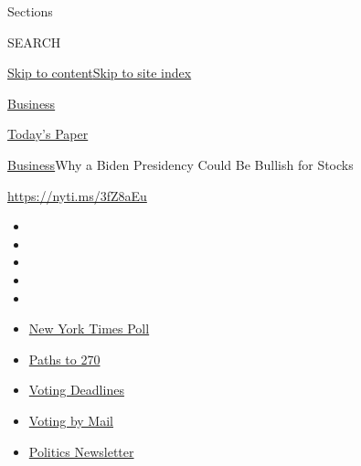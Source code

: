 Sections

SEARCH

\protect\hyperlink{site-content}{Skip to
content}\protect\hyperlink{site-index}{Skip to site index}

\href{https://www.nytimes3xbfgragh.onion/section/business}{Business}

\href{https://myaccount.nytimes3xbfgragh.onion/auth/login?response_type=cookie\&client_id=vi}{}

\href{https://www.nytimes3xbfgragh.onion/section/todayspaper}{Today's
Paper}

\href{/section/business}{Business}\textbar{}Why a Biden Presidency Could
Be Bullish for Stocks

\url{https://nyti.ms/3fZ8aEu}

\begin{itemize}
\item
\item
\item
\item
\item
\end{itemize}

\begin{itemize}
\item
  \href{https://www.nytimes3xbfgragh.onion/2020/09/12/us/politics/biden-trump-poll-wisconsin-minnesota.html?action=click\&pgtype=Article\&state=default\&region=TOP_BANNER\&context=storylines_menu}{New
  York Times Poll}
\item
  \href{https://www.nytimes3xbfgragh.onion/interactive/2020/us/elections/election-states-biden-trump.html?action=click\&pgtype=Article\&state=default\&region=TOP_BANNER\&context=storylines_menu}{Paths
  to 270}
\item
  \href{https://www.nytimes3xbfgragh.onion/interactive/2019/us/elections/2020-presidential-election-calendar.html?action=click\&pgtype=Article\&state=default\&region=TOP_BANNER\&context=storylines_menu}{Voting
  Deadlines}
\item
  \href{https://www.nytimes3xbfgragh.onion/interactive/2020/08/31/us/politics/vote-by-mail-deadlines.html?action=click\&pgtype=Article\&state=default\&region=TOP_BANNER\&context=storylines_menu}{Voting
  by Mail}
\item
  \href{https://www.nytimes3xbfgragh.onion/newsletters/politics?action=click\&pgtype=Article\&state=default\&region=TOP_BANNER\&context=storylines_menu}{Politics
  Newsletter}
\end{itemize}

